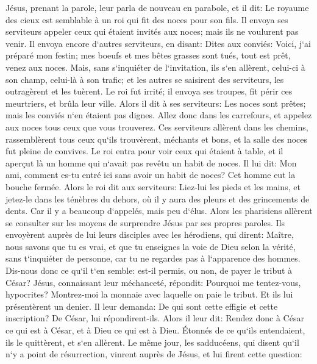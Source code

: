 \verse Jésus, prenant la parole, leur parla de nouveau en parabole, et il dit: 
\verse Le royaume des cieux est semblable à un roi qui fit des noces pour son fils. 
\verse Il envoya ses serviteurs appeler ceux qui étaient invités aux noces; mais ils ne voulurent pas venir. 
\verse Il envoya encore d`autres serviteurs, en disant: Dites aux conviés: Voici, j`ai préparé mon festin; mes boeufs et mes bêtes grasses sont tués, tout est prêt, venez aux noces. 
\verse Mais, sans s`inquiéter de l`invitation, ils s`en allèrent, celui-ci à son champ, celui-là à son trafic; 
\verse et les autres se saisirent des serviteurs, les outragèrent et les tuèrent. 
\verse Le roi fut irrité; il envoya ses troupes, fit périr ces meurtriers, et brûla leur ville. 
\verse Alors il dit à ses serviteurs: Les noces sont prêtes; mais les conviés n`en étaient pas dignes. 
\verse Allez donc dans les carrefours, et appelez aux noces tous ceux que vous trouverez. 
\verse Ces serviteurs allèrent dans les chemins, rassemblèrent tous ceux qu`ils trouvèrent, méchants et bons, et la salle des noces fut pleine de convives. 
\verse Le roi entra pour voir ceux qui étaient à table, et il aperçut là un homme qui n`avait pas revêtu un habit de noces. 
\verse Il lui dit: Mon ami, comment es-tu entré ici sans avoir un habit de noces? Cet homme eut la bouche fermée. 
\verse Alors le roi dit aux serviteurs: Liez-lui les pieds et les mains, et jetez-le dans les ténèbres du dehors, où il y aura des pleurs et des grincements de dents. 
\verse Car il y a beaucoup d`appelés, mais peu d`élus. 
\verse Alors les pharisiens allèrent se consulter sur les moyens de surprendre Jésus par ses propres paroles. 
\verse Ils envoyèrent auprès de lui leurs disciples avec les hérodiens, qui dirent: Maître, nous savons que tu es vrai, et que tu enseignes la voie de Dieu selon la vérité, sans t`inquiéter de personne, car tu ne regardes pas à l`apparence des hommes. 
\verse Dis-nous donc ce qu`il t`en semble: est-il permis, ou non, de payer le tribut à César? 
\verse Jésus, connaissant leur méchanceté, répondit: Pourquoi me tentez-vous, hypocrites? 
\verse Montrez-moi la monnaie avec laquelle on paie le tribut. Et ils lui présentèrent un denier. 
\verse Il leur demanda: De qui sont cette effigie et cette inscription? 
\verse De César, lui répondirent-ils. Alors il leur dit: Rendez donc à César ce qui est à César, et à Dieu ce qui est à Dieu. 
\verse Étonnés de ce qu`ils entendaient, ils le quittèrent, et s`en allèrent. 
\verse Le même jour, les sadducéens, qui disent qu`il n`y a point de résurrection, vinrent auprès de Jésus, et lui firent cette question: 
